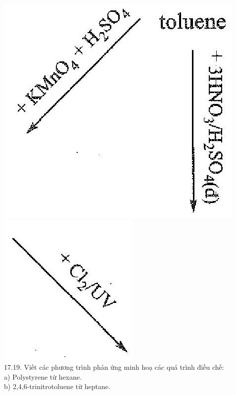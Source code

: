 \documentclass[10pt]{article}
\begin{document}
\includegraphics[max width=\textwidth, center]{2025_10_23_fa9073eecee116ad8cf2g-59(1)}\\
\includegraphics[max width=\textwidth, center]{2025_10_23_fa9073eecee116ad8cf2g-59(3)}\\
17.19. Viết các phương trình phản ứng minh hoạ các quá trình điều chế:\\
a) Polystyrene từ hexane.\\
b) 2,4,6-trinitrotoluene từ heptane.
\end{document}
